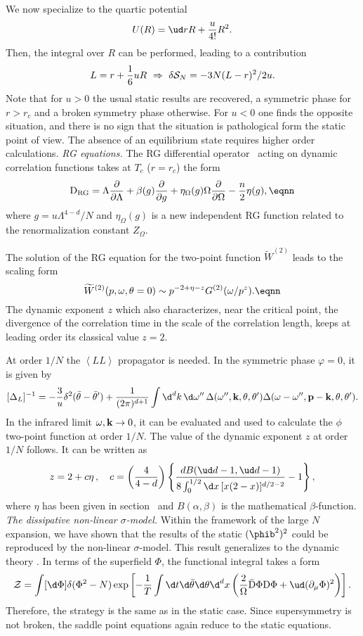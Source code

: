 We now specialize to the  quartic potential
$$U(R)=\ud rR+{u\over 4!}R^2. $$
Then, the integral over $R$ can be performed, leading to a contribution
$$L=r+\frac{1}{6}uR\ \Rightarrow\ \delta{\cal S}_N=- 3N  (L-r)^2/2u
.$$ Note that for $u>0$ the usual static results are recovered, a
symmetric phase for $r>r_c $ and a broken symmetry phase
otherwise. For $u<0$ one finds the opposite situation, and there
is no sign that the situation is pathological form the static
point of view. The absence of an equilibrium state requires higher
order calculations.
\smallskip
{\it RG equations.}
The RG differential operator \eRGgamln\ acting on dynamic correlation functions takes at $T_c$  ($r=r_c$) the  form
$${\rm D}_{\rm RG}=  \Lambda { \partial \over \partial  \Lambda } +\beta(g){\partial
\over \partial g}+\eta_ \Omega (g)\Omega{ \partial \over \partial \Omega}-{n
\over 2}\eta (g) ,  \eqnn $$
where $g=u\Lambda ^{4-d}/N$ and $\eta_ \Omega(g)$ is a new independent RG function related to the renormalization constant $Z_\Omega $.\par
The solution of the RG equation for the two-point function $\widetilde W^{  (2  )}$ leads to the scaling form
$$\widetilde W^{(2)}  (p,\omega , \thetab  =0 )\sim  p^{-2+\eta -z} G^{  (2  )}  ( \omega /p^{z}   ).
\eqnn $$ The dynamic exponent $z$ which also characterizes, near
the critical point, the divergence of  the correlation time in the
scale of the correlation length, keeps at leading order its
classical value $z=2$.\par At order $1/N$  the $\left<LL\right>$
propagator is needed. In the symmetric phase $\varphi=0$, it is
given by
$$[\Delta_L]^{-1}=-{3\over u}\delta^2(\bar\theta-\bar\theta')+{1\over(2\pi)^{d+1}}
\int\d^d k\,\d \omega'' \,\Delta( \omega '',{\bf k}, \theta,\theta')\Delta(\omega- \omega '',{\bf p-k},\theta,\theta') .$$
In the infrared limit $\omega, {\bf k}\to 0$, it can be evaluated and used to
calculate the $\phi$ two-point function at order $1/N$.
The value of the dynamic exponent $z$ at order $1/N$ follows. It can be written as \rHalper
$$z=2+c\eta\,, \quad c=\left(4\over  4-d\right)\left\{ {dB(\ud d-1, \ud d-1)
\over 8\int_0^{1/2}\d x\,[x(2-x)]^{d/2-2}} -1\right\},$$
where $\eta$ has been given in section \sssfivNRT\ and $B(\alpha ,\beta )$ is
the mathematical $\beta $-function.
\medskip
{\it The dissipative non-linear $\sigma $-model.} Within the framework of the large $N$ expansion, we have shown that the results of the static $(\phib^2)^2$ could be reproduced by the non-linear $\sigma $-model. This result generalizes to the dynamic theory \rBaus.
In terms of the superfield $\Phi$, the functional integral takes a form
$${\cal Z}=\int[\d\Phi]\delta (\Phi^2-N)\exp\left[-{1\over T}\int\d t\d\bar\theta\d\theta\d^d x
\left({2\over\Omega}{\rm \bar D}\Phi{\rm
D}\Phi+\ud(\partial_\mu\Phi)^2\right)\right].$$
Therefore, the strategy is the same as in the static case. Since supersymmetry is not broken, the saddle point equations again reduce to the static equations.



